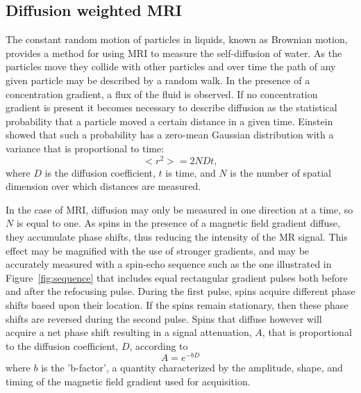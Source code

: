 \subsection{Diffusion weighted MRI}
The constant random motion of particles in liquids, known as Brownian motion, provides a method for using MRI to measure the self-diffusion of water.  As the particles move they collide with other particles and over time the path of any given particle may be described by a random walk.  In the presence of a concentration gradient, a flux of the fluid is observed.  If no concentration gradient is present it becomes necessary to describe diffusion as the statistical probability that a particle moved a certain distance in a given time.  Einstein~\cite{Einstein} showed that such a probability has a zero-mean Gaussian distribution with a variance that is proportional to time:
$$ <r^2> = 2NDt, $$
where $D$ is the diffusion coefficient, $t$ is time, and $N$ is the number of spatial dimension over which distances are measured.

In the case of MRI, diffusion may only be measured in one direction at a time, so $N$ is equal to one.  As spins in the presence of a magnetic field gradient diffuse, they accumulate phase shifts, thus reducing the intensity of the MR signal.  This effect may be magnified with the use of stronger gradients, and may be accurately measured with a spin-echo sequence such as the one illustrated in Figure~\ref{fig:sequence} that includes equal rectangular gradient pulses both before and after the refocusing pulse.  During the first pulse, spins acquire different phase shifts based upon their location.  If the spins remain stationary, then these phase shifts are reversed during the second pulse.  Spins that diffuse however will acquire a net phase shift resulting in a signal attenuation, $A$, that is proportional to the diffusion coefficient, $D$, according to
\begin{equation}
\label{eq:attenuation1}
A = e^{-bD}
\end{equation}
where $b$ is the 'b-factor', a quantity characterized by the amplitude, shape, and timing of the magnetic field gradient used for acquisition.

